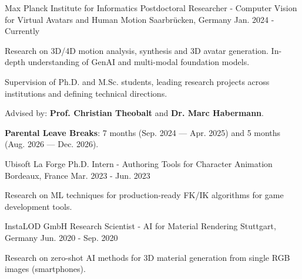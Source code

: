 

\begin{cventries}

\cventry
  {Max Planck Institute for Informatics} %
  {Postdoctoral Researcher - Computer Vision for Virtual Avatars and Human Motion} %
  {Saarbrücken, Germany} %
  {Jan. 2024 - Currently} %
  {
    \begin{cvitems} %
      \item {Research on 3D/4D motion analysis, synthesis and 3D avatar generation. In-depth understanding of GenAI and multi-modal foundation models.}
      \item {Supervision of Ph.D. and M.Sc. students, leading research projects across institutions and defining technical directions.}
      \item {Advised by: \textbf{Prof. Christian Theobalt} and \textbf{Dr. Marc Habermann}.}
      \item {\textbf{Parental Leave Breaks}: 7 months (Sep. 2024 --- Apr. 2025) and 5 months (Aug. 2026 --- Dec. 2026).}
    \end{cvitems}
  }

\vspace{0.5cm}
\cventry
  {Ubisoft La Forge} %
  {Ph.D. Intern - Authoring Tools for Character Animation} %
  {Bordeaux, France} %
  {Mar. 2023 - Jun. 2023} %
  {
    \begin{cvitemone} %
      \item {Research on ML techniques for production-ready FK/IK algorithms for game development tools.}
    \end{cvitemone}
  }

\vspace{0cm}
\cventry
  {InstaLOD GmbH} %
  {Research Scientist - AI for Material Rendering} %
  {Stuttgart, Germany} %
  {Jun. 2020 - Sep. 2020} %
  {
    \begin{cvitemone} %
      \item {Research on zero-shot AI methods for 3D material generation from single RGB images (smartphones).}
    \end{cvitemone}
  }


\end{cventries}

